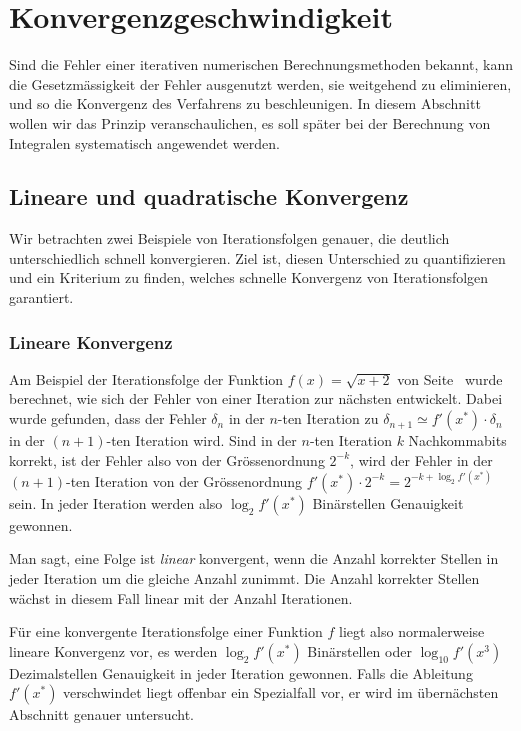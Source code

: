 %
%
%
\section{Konvergenzgeschwindigkeit
\label{buch:section:geschwidnigkeit}}
Sind die Fehler einer iterativen numerischen Berechnungsmethoden
bekannt, kann die Gesetzmässigkeit der Fehler ausgenutzt werden,
sie weitgehend zu eliminieren, und so die Konvergenz des Verfahrens
zu beschleunigen.
In diesem Abschnitt wollen wir das Prinzip veranschaulichen, es
soll später bei der Berechnung von Integralen systematisch
angewendet werden.

\subsection{Lineare und quadratische Konvergenz
\label{buch:subsection:linearekonvergenz}}
Wir betrachten zwei Beispiele von Iterationsfolgen genauer, die
deutlich unterschiedlich schnell konvergieren.
Ziel ist, diesen Unterschied zu quantifizieren und ein Kriterium
zu finden, welches schnelle Konvergenz von Iterationsfolgen garantiert.

\subsubsection{Lineare Konvergenz}
Am Beispiel der Iterationsfolge der Funktion $f(x)=\sqrt{x+2}$
von Seite~\pageref{section:beispiel:sqrtiteration}
wurde berechnet, wie sich der Fehler von einer Iteration zur nächsten
entwickelt.
Dabei wurde gefunden, dass der Fehler $\delta_n$ in der $n$-ten Iteration
zu $\delta_{n+1}\simeq f'(x^*)\cdot\delta_n$ in der $(n+1)$-ten Iteration
wird.
Sind in der $n$-ten Iteration $k$ Nachkommabits korrekt, ist der Fehler
also von der Grössenordnung $2^{-k}$, wird der Fehler in der $(n+1)$-ten
Iteration von der Grössenordnung $f'(x^*) \cdot 2^{-k}= 2^{-k+\log_2f'(x^*)}$
sein.
In jeder Iteration werden also $\log_2f'(x^*)$ Binärstellen Genauigkeit
gewonnen.

Man sagt, eine Folge ist {\em linear} konvergent, wenn die Anzahl
korrekter Stellen in jeder Iteration um die gleiche Anzahl zunimmt.
Die Anzahl korrekter Stellen wächst in diesem Fall linear mit der
Anzahl Iterationen.

Für eine konvergente Iterationsfolge einer Funktion $f$ liegt also
normalerweise lineare Konvergenz vor, es werden $\log_2 f'(x^*)$
Binärstellen oder $\log_10 f'(x^3)$ Dezimalstellen Genauigkeit in
jeder Iteration gewonnen.
Falls die Ableitung $f'(x^*)$ verschwindet liegt offenbar ein
Spezialfall vor, er wird im übernächsten Abschnitt genauer untersucht.

